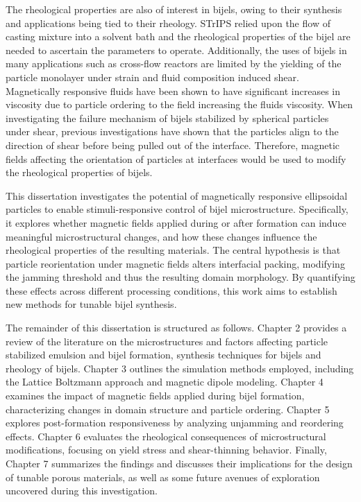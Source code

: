 The rheological properties are also of interest in bijels, owing to their synthesis and applications being tied to their rheology. STrIPS relied upon the
flow of casting mixture into a solvent bath and the rheological properties of the bijel are needed to ascertain the parameters to operate. 
\cite{haase_situ_2016, haase_continuous_2015} Additionally,
the uses of bijels in many applications such as cross-flow reactors are limited by the yielding of the particle monolayer under strain and fluid 
composition induced shear. \cite{boakye-ansah_controlling_2020} Magnetically responsive fluids have been shown to have significant increases in viscosity
due to particle ordering to the field increasing the fluids viscosity. When investigating the failure mechanism of bijels stabilized by spherical
particles under shear, previous investigations have shown that the particles align to the direction of shear before being pulled out of the interface.
\cite{bonaccorso_shear_2020} Therefore, magnetic fields affecting the orientation of particles at interfaces would be used to modify the rheological 
properties of bijels.

This dissertation investigates the potential of magnetically responsive ellipsoidal particles to enable stimuli-responsive control of bijel microstructure. 
Specifically, it explores whether magnetic fields applied during or after formation can induce meaningful microstructural changes, and how these changes 
influence the rheological properties of the resulting materials. The central hypothesis is that particle reorientation under magnetic fields alters 
interfacial packing, modifying the jamming threshold and thus the resulting domain morphology. By quantifying these effects across different processing 
conditions, this work aims to establish new methods for tunable bijel synthesis.

The remainder of this dissertation is structured as follows. Chapter 2 provides a review of the literature on the microstructures and factors affecting
particle stabilized emulsion and bijel formation, synthesis techniques for bijels and rheology of bijels. Chapter 3 outlines the simulation methods 
employed, including the Lattice Boltzmann approach and magnetic dipole modeling. Chapter 4 examines the impact of magnetic fields applied during bijel 
formation, characterizing changes in domain structure and particle ordering. Chapter 5 explores post-formation responsiveness by analyzing unjamming 
and reordering effects. Chapter 6 evaluates the rheological consequences of microstructural modifications, focusing on yield stress and shear-thinning 
behavior. Finally, Chapter 7 summarizes the findings and discusses their implications for the design of tunable porous materials, as well as some 
future avenues of exploration uncovered during this investigation.